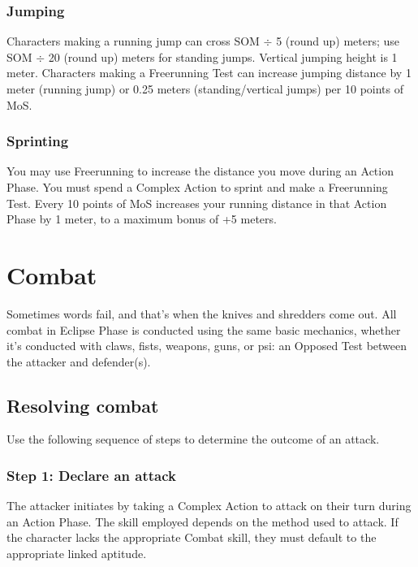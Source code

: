 \subsubsection{Jumping} 

Characters making a running jump can cross SOM $\div$ 5 (round up) meters; use SOM $\div$ 20 (round up) meters for standing jumps. Vertical jumping height is 1 meter. Characters making a Freerunning Test can increase jumping distance by 1 meter (running jump) or 0.25 meters (standing/vertical jumps) per 10 points of MoS. 

\subsubsection{Sprinting} 

You may use Freerunning to increase the distance you move during an Action Phase. You must spend a Complex Action to sprint and make a Freerunning Test. Every 10 points of MoS increases your running distance in that Action Phase by 1 meter, to a maximum bonus of +5 meters. 



\section{Combat} \label{sec:combat} 

Sometimes words fail, and that’s when the knives and shredders come out. All combat in Eclipse Phase is conducted using the same basic mechanics, whether it’s conducted with claws, fists, weapons, guns, or psi: an Opposed Test between the attacker and defender(s). 

\subsection{Resolving combat} 

Use the following sequence of steps to determine the outcome of an attack. 

\subsubsection{Step 1: Declare an attack} 

The attacker initiates by taking a Complex Action to attack on their turn during an Action Phase. The skill employed depends on the method used to attack. If the character lacks the appropriate Combat skill, they must default to the appropriate linked aptitude. 

